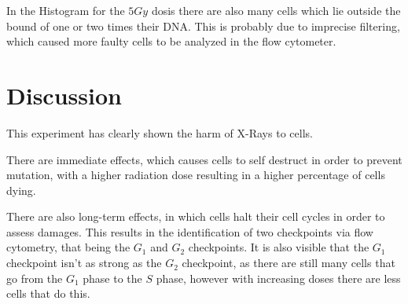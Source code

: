 \documentclass[]{scrartcl}
\begin{document}
In the Histogram for the $5Gy$ dosis there are also many cells which lie outside the bound of one or two times their DNA. This is probably due to imprecise filtering, which caused more faulty cells to be analyzed in the flow cytometer.


\section{Discussion}
This experiment has clearly shown the harm of X-Rays to cells. 

There are immediate effects, which causes cells to self destruct in order to prevent mutation, with a higher radiation dose resulting in a higher percentage of cells dying.

There are also long-term effects, in which cells halt their cell cycles in order to assess damages. This results in the identification of two checkpoints via flow cytometry, that being the $G_1$ and $G_2$ checkpoints. It is also visible that the $G_1$ checkpoint isn't as strong as the $G_2$ checkpoint, as there are still many cells that go from the $G_1$ phase to the $S$ phase, however with increasing doses there are less cells that do this.
\end{document}
